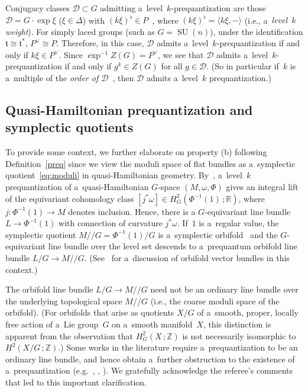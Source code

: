 \documentclass[11pt]{article}
\numberwithin{equation}{section}
\DeclareMathOperator{\SU}{SU}
\begin{document}
\begin{Example}
Conjugacy classes $\mathcal{D} \subset G$ admitting a~level~$k$-prequantization are those $\mathcal{D}=G\cdot \exp \xi$
($\xi \in \Delta$) with $(k\xi)^\flat \in P$~\cite{BasicGerbe}, where $(k\xi)^\flat = \langle k\xi,- \rangle$ (i.e., a~\emph{level~$k$ weight}).
For simply laced groups (such as $G=\SU(n)$), under the identif\/ication $\mathfrak{t} \cong \mathfrak{t}^*$, $P^\vee
\cong P$.
Therefore, in this case, $\mathcal{D}$ admits a~level~$k$-prequantization if and only if $k\xi \in P^\vee$.
Since $\exp^{-1} Z(G) = P^\vee$, we see that $\mathcal{D}$ admits a~level~$k$-prequantization if and only if $g^k \in
Z(G)$ for all $g \in \mathcal{D}$.
(So in particular if~$k$ is a~multiple of the \emph{order of $\mathcal{D}$}~\cite[Def\/inition 5.76]{BL}, then
$\mathcal{D}$ admits a~level~$k$ prequantization.)
\end{Example}

\subsection{Quasi-Hamiltonian prequantization and symplectic quotients}\label{pqbundle}

To provide some context, we further elaborate on property (b) following Def\/inition~\ref{preq} since we view the moduli
space of f\/lat bundles as a~symplectic quotient~\eqref{eq:moduli} in quasi-Hamiltonian geometry.
By~\cite[Proposition~3.6]{JGP}, a~level~$k$ prequantization of a~quasi-Hamiltonian $G$-space $(M,\omega,\Phi)$ gives
an integral lift of the equivariant cohomology class $[j^*\omega] \in H^2_G(\Phi^{-1}(1)\,;{\mathbb{R}})$, where
$j:\Phi^{-1}(1) \to M$ denotes inclusion.
Hence, there is a $G$-equivariant line bundle $L\to \Phi^{-1}(1)$ with connection of curvature $j^*\omega$.
If~$1$ is a~regular value, the symplectic quotient $M/ /G= \Phi^{-1}(1)/G$ is a~symplectic orbifold~\cite{AMM} and
the $G$-equivariant line bundle over the level set descends to a~prequantum orbifold line bundle $L/G \to M/ /G$.
(See~\cite[Example 2.29]{Adem} for a~discussion of orbifold vector bundles in this context.)

\begin{Remark}
The orbifold line bundle $L/G\to M/ /G$ need not be an ordinary line bundle over the underlying topological space $M/
/G$ (i.e., the coarse moduli space of the orbifold).
(For orbifolds that arise as quotients $X/G$ of a~smooth, proper, locally free action of a~Lie group~$G$ on a~smooth
manifold~$X$, this distinction is apparent from the observation that $H_G^2(X\,;{\mathbb{Z}})$ is not necessarily
isomorphic to $H^2(X/G\,;{\mathbb{Z}})$.) Some works in the literature require a~prequantization to be an ordinary line
bundle, and hence obtain a~further obstruction to the existence of a~prequantization (e.g.~\cite[Theorem 4.2]{Ko},
\cite[Theorems~4.12 and~6.1]{DW}, \cite[Lemme~3.2]{Pa}).
We gratefully acknowledge the referee's comments that led to this important clarif\/ication.
\end{Remark}
\end{document}

